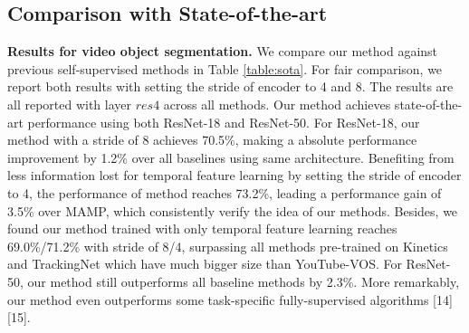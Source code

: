 \documentclass{article}
\begin{document}
\subsection{Comparison with State-of-the-art}
\textbf{Results for video object segmentation.}
We compare our method against previous self-supervised methods in Table \ref{table:sota}. For fair comparison, we report both results with setting the stride of encoder to 4 and 8. The results are all reported with layer $res4$ across all methods. Our method achieves state-of-the-art performance using both ResNet-18 and ResNet-50. For ResNet-18, our method with a stride of 8 achieves 70.5\%, making a absolute performance improvement by 1.2\% over all baselines using same architecture. Benefiting from less information lost for temporal feature learning by setting the stride of encoder to 4, the performance of method reaches 73.2\%, leading a performance gain of 3.5\% over MAMP, which consistently verify the idea of our methods. Besides, we found our method trained with only temporal feature learning  reaches 69.0\%/71.2\% with stride of 8/4, surpassing all methods pre-trained on Kinetics and TrackingNet which have much bigger size than YouTube-VOS. For ResNet-50, our method still outperforms all baseline methods by 2.3\%. More remarkably, our method even outperforms some task-specific fully-supervised algorithms [14][15].
\end{document}
